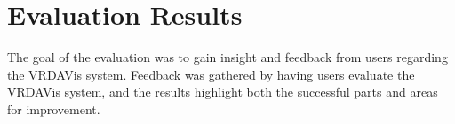 \section{Evaluation Results}
\label{sec:evaluation-results}

The goal of the evaluation was to gain insight and feedback from users regarding the VRDAVis system. 
Feedback was gathered by having users evaluate the VRDAVis system, and the results highlight both the successful parts and areas for improvement.








